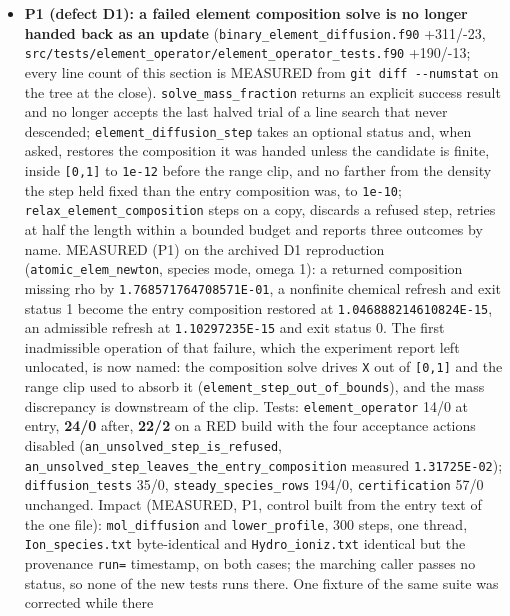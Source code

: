 \documentclass[english,a4paper]{my_memo}
\providecommand{\tightlist}{\setlength{\itemsep}{0pt}\setlength{\parskip}{0pt}}
\begin{document}
\begin{itemize}
\tightlist
\item
  \textbf{P1 (defect D1): a failed element composition solve is no longer handed
  back as an update} (\texttt{binary\_element\_diffusion.f90} +311/-23,
  \texttt{src/tests/element\_operator/element\_operator\_tests.f90} +190/-13; every line
  count of this section is MEASURED from \texttt{git\ diff\ -\/-numstat} on the tree at
  the close).
  \texttt{solve\_mass\_fraction} returns an explicit success result and no longer
  accepts the last halved trial of a line search that never descended;
  \texttt{element\_diffusion\_step} takes an optional status and, when asked,
  restores the composition it was handed unless the candidate is finite,
  inside \texttt{{[}0,1{]}} to \texttt{1e-12} before the range clip, and no farther from the
  density the step held fixed than the entry composition was, to \texttt{1e-10};
  \texttt{relax\_element\_composition} steps on a copy, discards a refused step,
  retries at half the length within a bounded budget and reports three
  outcomes by name. MEASURED (P1) on the archived D1 reproduction
  (\texttt{atomic\_elem\_newton}, species mode, omega 1): a returned composition
  missing rho by \texttt{1.768571764708571E-01}, a nonfinite chemical refresh and
  exit status 1 become the entry composition restored at
  \texttt{1.046888214610824E-15}, an admissible refresh at \texttt{1.10297235E-15} and
  exit status 0. The first inadmissible operation of that failure, which the
  experiment report left unlocated, is now named: the composition solve
  drives \texttt{X} out of \texttt{{[}0,1{]}} and the range clip used to absorb it
  (\texttt{element\_step\_out\_of\_bounds}), and the mass discrepancy is downstream of
  the clip. Tests: \texttt{element\_operator} 14/0 at entry, \textbf{24/0} after, \textbf{22/2}
  on a RED build with the four acceptance actions disabled
  (\texttt{an\_unsolved\_step\_is\_refused}, \texttt{an\_unsolved\_step\_leaves\_the\_entry\_composition}
  measured \texttt{1.31725E-02}); \texttt{diffusion\_tests} 35/0, \texttt{steady\_species\_rows}
  194/0, \texttt{certification} 57/0 unchanged. Impact (MEASURED, P1, control built
  from the entry text of the one file): \texttt{mol\_diffusion} and \texttt{lower\_profile},
  300 steps, one thread, \texttt{Ion\_species.txt} byte-identical and
  \texttt{Hydro\_ioniz.txt} identical but the provenance \texttt{run=} timestamp, on both
  cases; the marching caller passes no status, so none of the new tests
  runs there. One fixture of the same suite was corrected while there

\end{itemize}
\end{document}
